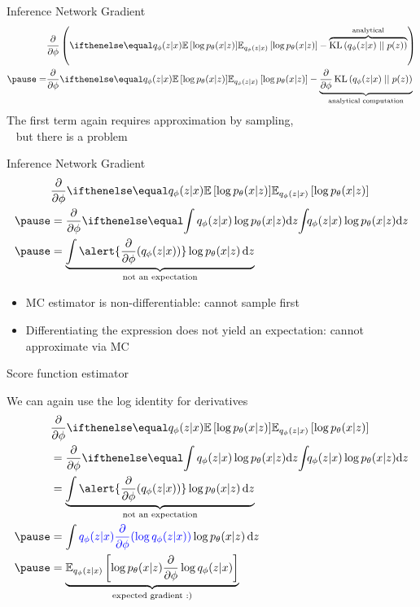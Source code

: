\begin{frame}{Inference Network Gradient}
\begin{equation*}
\begin{aligned}
&\pdv{\phi}\left(\E[q_\phi(z|x)]{\log p_\theta(x|z)} - \overbrace{\KL{q_\phi(z|x)}{p(z)}}^{\text{analytical}} \right) \\ \pause
=&\pdv{\phi}\E[q_\phi(z|x)]{\log p_\theta(x|z)} - \underbrace{\pdv{\phi}\KL{q_\phi(z|x)}{p(z)}}_{\text{analytical computation}} \\
\end{aligned}
\end{equation*}
\pause
The first term again requires approximation by sampling, \\
~ but there is a problem

\end{frame}

\begin{frame}{Inference Network Gradient}
\begin{equation*}
\begin{aligned}
&\pdv{\phi}\E[q_\phi(z|x)]{\log p_\theta(x|z)} \\ \pause
&= \pdv{\phi} \intl{q_\phi(z|x)\log p_\theta(x|z)}{z} \\ \pause
&=  \underbrace{\int \alert{\pdv{\phi}(q_\phi(z|x))}\log p_\theta(x|z) \dd{z}}_{\text{not an expectation}} 
\end{aligned}
\end{equation*}

\pause

\begin{itemize}
	\item MC estimator is non-differentiable: cannot sample first\\ \pause
	\item Differentiating the expression does not yield an expectation: cannot approximate via MC
\end{itemize}

\end{frame}

\begin{frame}{Score function estimator}

We can again use the log identity for derivatives
\begin{equation*}
\begin{aligned}
&\pdv{\phi}\E[q_\phi(z|x)]{\log p_\theta(x|z)} \\ 
&= \pdv{\phi} \intl{q_\phi(z|x)\log p_\theta(x|z)}{z} \\ 
&=  \underbrace{\int \alert{\pdv{\phi}(q_\phi(z|x))}\log p_\theta(x|z) \dd{z}}_{\text{not an expectation}} \\ \pause
&= \int \textcolor{blue}{q_\phi(z|x) \pdv{\phi}(\log q_\phi(z|x))} \log p_\theta(x|z) \dd{z} \\ \pause
&= \underbrace{\mathbb E_{q_\phi(z|x)} \left[  \log p_\theta(x|z)  \pdv{\phi}\log q_\phi(z|x)\right]}_{\text{expected gradient :)}}
\end{aligned}
\end{equation*}

\end{frame}

